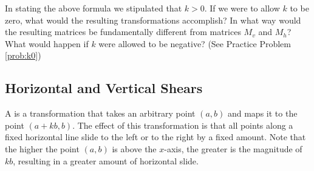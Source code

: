 \documentclass{ximera}
\begin{document}
In stating the above formula we stipulated that $k>0$.  If we were to allow $k$ to be zero, what would the resulting transformations accomplish?  In what way would the resulting matrices be fundamentally different from matrices $M_v$ and $M_h$?  What would happen if $k$ were allowed to be negative? (See Practice Problem \ref{prob:k0})

\subsection*{Horizontal and Vertical Shears}
A  is a transformation that takes an arbitrary point $(a, b)$ and maps it to the point $(a+kb, b)$.  The effect of this transformation is that all points along a fixed horizontal line slide to the left or to the right by a fixed amount.  Note that the higher the point $(a, b)$ is above the $x$-axis, the greater is the magnitude of $kb$, resulting in a greater amount of horizontal slide.
\end{document}
